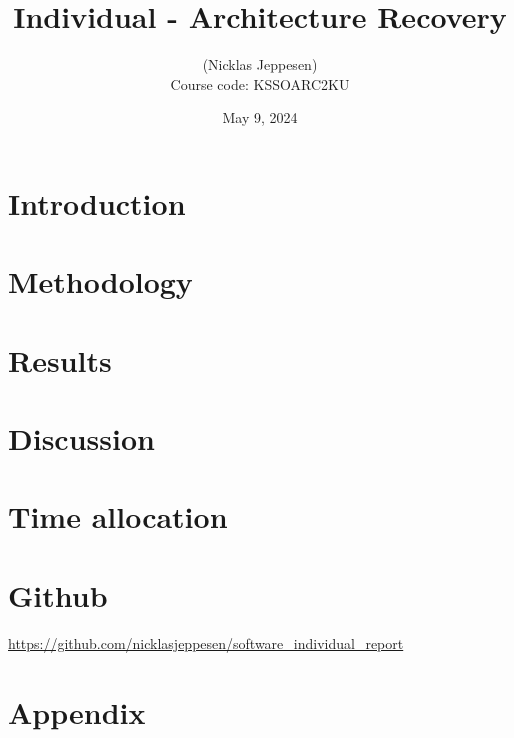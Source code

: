 \documentclass[12pt,a4paper]{report}
\title{Individual - Architecture Recovery}
\author{ (Nicklas Jeppesen) \\ Course code: KSSOARC2KU}
\date{May 9, 2024}
\begin{document}
	\maketitle
    \tableofcontents
    \listoffigures

    
    
    \chapter{Introduction}

    \chapter{Methodology}

    \chapter{Results}

    \chapter{Discussion}

    \chapter{Time allocation}

    \chapter{Github}

    \url{https://github.com/nicklasjeppesen/software_individual_report}

    \chapter{Appendix}
    
    
    
    






   
    
\end{document}
